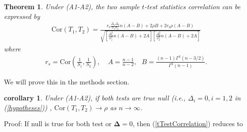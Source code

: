 \documentclass[12pt, a4paper]{article}
\newtheorem{theorem}{Theorem}       %
\newtheorem{corollary}{corollary}
\begin{document}
	
%	
%	
	
	
	\begin{theorem}\label{theoremTstat} 
		Under (A1-A2),  the two sample $t$-test statistics correlation can be expressed by 
		\begin{align}\label{tTestCorrelation}
			\text{Cor}(T_1, T_2)  = \frac{r_{\text{s}}\frac{\Delta_1\Delta_2}{\sigma_1\sigma_2}n(A-B) + 2\rho B
				+ 2r_{\text{s}}\rho(A-B)}{\sqrt{\left[ \frac{\Delta_1^2}{\sigma_1^2}n(A-B) + 2
					A\right]\left[\frac{\Delta_2^2}{\sigma_2^2}n(A-B) + 2 A\right]}}
		\end{align} where 
		\begin{align}\label{invScor}
			r_s = \text{Cor}(\frac{1}{S_1}, \frac{1}{S_2}), ~~~~~A = \frac{n-1}{n-2}, ~~~B =
			\frac{(n-1)\Gamma^2(n-3/2)}{\Gamma^2(n-1)}.
		\end{align}
	\end{theorem}
	We will prove this in the methods section.
	
	\begin{corollary} 
		Under (A1-A2), if both tests are true null (i.e., $\Delta_i = 0, i=1, 2$ in (\ref{hypotheses})) ,
		$\text{Cor}({T_1, T_2})\rightarrow \rho$ as $n \rightarrow \infty$. 
	\end{corollary}
	Proof:  If null is true for both test or $\bm \Delta  = 0$, then (\ref{tTestCorrelation}) reduces to
	
\end{document}
